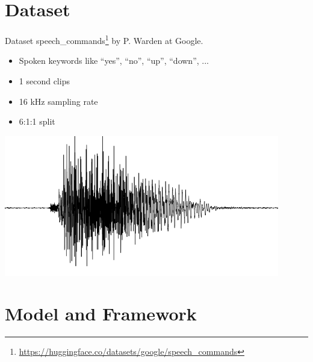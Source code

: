 \documentclass{beamer}
\begin{document}
\section{Dataset}
\begin{frame}{Dataset}
	speech\_commands\footnote{\url{https://huggingface.co/datasets/google/speech_commands}} by P. Warden at Google.\vspace{10mm}

\begin{minipage}{0.5\textwidth}

	\begin{itemize}
		\item<2-> Spoken keywords like ``yes'', ``no'', ``up'', ``down'', ...
		\item<3-> 1 second clips
		\item<4-> 16 kHz sampling rate
		\item<5-> 6:1:1 split
	\end{itemize}
	\end{minipage}
	\begin{minipage}{0.48\textwidth}
		\includegraphics[width=0.9\textwidth]{figures/wave.png}
	\end{minipage}

\end{frame}

\section{Model and Framework}
\end{document}
